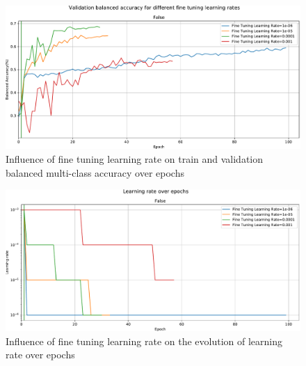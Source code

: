     \begin{figure}[ht]
        \centering
        \includegraphics[width=\textwidth]{figs/densenet201_ftlr_bma_over_epochs.pdf}
        \caption{Influence of fine tuning learning rate on train and validation balanced multi-class accuracy over epochs}
        \label{fig:ftlr_bma_over_epochs}
    \end{figure}
    \begin{figure}[ht]
        \centering
        \includegraphics[width=\textwidth]{figs/densenet201_ftlr_lr_over_epochs.pdf}
        \caption{Influence of fine tuning learning rate on the evolution of learning rate over epochs}
        \label{fig:ftlr_lr_over_epochs}
    \end{figure}
    
